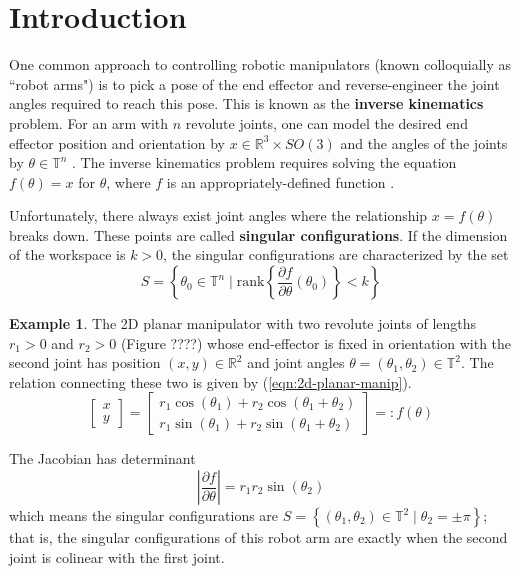 \documentclass[12pt]{article}
\theoremstyle{definition}
\newtheorem{example}{Example}
\begin{document}
    
\section{Introduction}
One common approach to controlling robotic manipulators 
(known colloquially as ``robot arms") is to pick a pose of the end effector and
reverse-engineer the joint angles required to reach this pose. This is known as
the \textbf{inverse kinematics} problem. For an arm with \(n\) revolute joints, 
one can model the desired end effector position and orientation by
\(x \in \mathbb{R}^3 \times SO(3)\) and the angles of the joints by 
\(\theta \in \mathbb{T}^n\) \cite{robots-fiber-bundles}. 
The inverse kinematics problem requires solving the
equation \(f(\theta) = x\) for \(\theta\), where \(f\) is an 
appropriately-defined function \cite{program-kin-red-manips}.

Unfortunately, there always exist joint angles where the relationship 
\(x = f(\theta)\) breaks down. These points are called 
\textbf{singular configurations}. If the dimension of the workspace is 
\(k > 0\), the singular configurations are characterized by the set
\[
    S = \left\{ \theta_0 \in \mathbb{T}^n \mid 
    \text{rank}\left\{
        \frac{\partial f}{\partial\theta}(\theta_0) 
    \right\} < k \right\}
\]

\begin{example}

The 2D planar manipulator with two revolute joints of lengths \(r_1 > 0\)
and \(r_2 > 0\) (Figure ????) whose end-effector is fixed in orientation with the
second joint has position \((x,y) \in \mathbb{R}^2\) and joint angles 
\(\theta = (\theta_1,\theta_2) \in \mathbb{T}^2\). 
The relation connecting these two is given by (\ref{eqn:2d-planar-manip}).
\begin{equation}\label{eqn:2d-planar-manip}
    \begin{bmatrix}x \\ y \end{bmatrix}
    = \begin{bmatrix} 
        r_1\cos(\theta_1) + r_2\cos(\theta_1 + \theta_2) \\
        r_1\sin(\theta_1) + r_2\sin(\theta_1 + \theta_2)
    \end{bmatrix} =: f(\theta)
\end{equation}

The Jacobian has determinant
\[
    \left| \frac{\partial f}{\partial \theta} \right| = r_1r_2\sin(\theta_2)
\]
which means the singular configurations are 
\(S = \left\{ (\theta_1,\theta_2) \in \mathbb{T}^2 \mid \theta_2 = \pm\pi\right\}\); 
that is, the singular configurations of this robot arm are exactly when the
second joint is colinear with the first joint.
\end{example}
\end{document}
